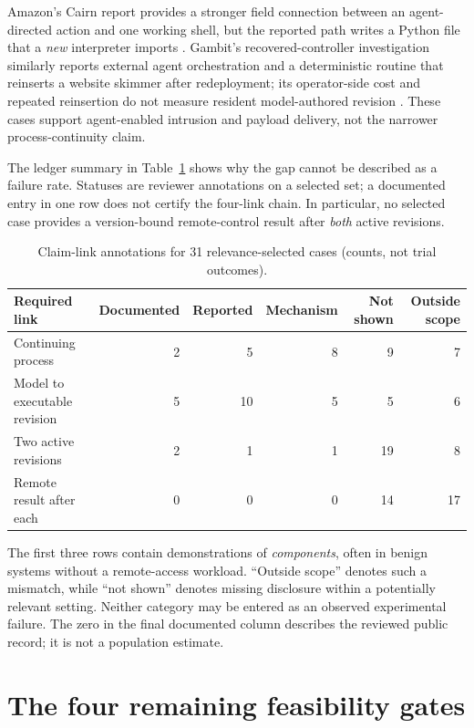 \documentclass[11pt,letterpaper]{article}
\begin{document}
Amazon's Cairn report provides a stronger field connection between an agent-directed action and one working shell, but the reported path writes a Python file that a \emph{new} interpreter imports \cite{aws}. Gambit's recovered-controller investigation similarly reports external agent orchestration and a deterministic routine that reinserts a website skimmer after redeployment; its operator-side cost and repeated reinsertion do not measure resident model-authored revision \cite{gambit}. These cases support agent-enabled intrusion and payload delivery, not the narrower process-continuity claim.

The ledger summary in Table~\ref{tab:ledger} shows why the gap cannot be described as a failure rate. Statuses are reviewer annotations on a selected set; a documented entry in one row does not certify the four-link chain. In particular, no selected case provides a version-bound remote-control result after \emph{both} active revisions.

\begin{table}[htbp]
\centering\small
\caption{Claim-link annotations for 31 relevance-selected cases (counts, not trial outcomes).}\label{tab:ledger}
\begin{tabular}{@{}lrrrrr@{}}
\toprule
Required link & Documented & Reported & Mechanism & Not shown & Outside scope \\
\midrule
Continuing process & 2 & 5 & 8 & 9 & 7 \\
Model to executable revision & 5 & 10 & 5 & 5 & 6 \\
Two active revisions & 2 & 1 & 1 & 19 & 8 \\
Remote result after each & 0 & 0 & 0 & 14 & 17 \\
\bottomrule
\end{tabular}
\end{table}

The first three rows contain demonstrations of \emph{components}, often in benign systems without a remote-access workload. ``Outside scope'' denotes such a mismatch, while ``not shown'' denotes missing disclosure within a potentially relevant setting. Neither category may be entered as an observed experimental failure. The zero in the final documented column describes the reviewed public record; it is not a population estimate.

\section{The four remaining feasibility gates}\label{sec:constraints}
\end{document}
